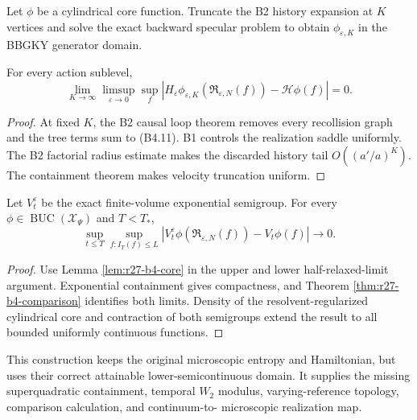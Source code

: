 Let $\phi$ be a cylindrical core function.  Truncate the B2 history expansion
at $K$ vertices and solve the exact backward specular problem to obtain
$\phi_{\varepsilon,K}$ in the BBGKY generator domain.

\begin{lemma}
\label{lem:r27-b4-core}
For every action sublevel,
\[
 \lim_{K\to\infty}\limsup_{\varepsilon\to0}
 \sup_f\left|
 H_\varepsilon\phi_{\varepsilon,K}
     (\mathfrak R_{\varepsilon,N}(f))
 -\mathcal H\phi(f)\right|=0.                             \tag{B4.12}
\]
\end{lemma}

\begin{proof}
At fixed $K$, the B2 causal loop theorem removes every recollision graph and
the tree terms sum to (B4.11).  B1 controls the realization saddle uniformly.
The B2 factorial radius estimate makes the discarded history tail
$O((a'/a)^K)$.  The containment theorem makes velocity truncation uniform.
\end{proof}

\begin{theorem}
\label{thm:r27-b4-limit}
Let $V_t^\varepsilon$ be the exact finite-volume exponential semigroup.  For
every $\phi\in\operatorname{BUC}(\mathcal X_\Psi)$ and $T<T_*$,
\[
 \sup_{t\le T}\sup_{f:I_T(f)\le L}
 \left|V_t^\varepsilon\phi
       (\mathfrak R_{\varepsilon,N}(f))-V_t\phi(f)\right|\to0.            \tag{B4.13}
\]
\end{theorem}

\begin{proof}
Use Lemma \ref{lem:r27-b4-core} in the upper and lower half-relaxed-limit
argument.  Exponential containment gives compactness, and Theorem
\ref{thm:r27-b4-comparison} identifies both limits.  Density of the
resolvent-regularized cylindrical core and contraction of both semigroups
extend the result to all bounded uniformly continuous functions.
\end{proof}

This construction keeps the original microscopic entropy and Hamiltonian,
but uses their correct attainable lower-semicontinuous domain.  It supplies
the missing superquadratic containment, temporal $W_2$ modulus,
varying-reference topology, comparison calculation, and continuum-to-
microscopic realization map.
